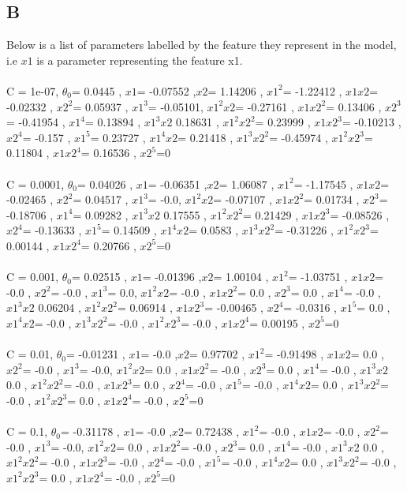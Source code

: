 \documentclass[11pt]{article} %
\begin{document}
\subsection{B}
Below is a list of parameters labelled by the feature they represent in the model, i.e \(x1\) is a parameter representing the feature x1.\\\\
C = 1e-07, \(\theta_0\)= 0.0445 , \(x1\)= -0.07552 ,\(x2\)= 1.14206 , \(x1^2\)= -1.22412 , \(x1 x2\)= -0.02332 , \(x2^2\)= 0.05937 , \(x1^3\)= -0.05101, \(x1^2 x2\)= -0.27161 , \(x1 x2^2\)= 0.13406 , \(x2^3\)= -0.41954 , \(x1^4\)= 0.13894 , \(x1^3 x2\) 0.18631 , \(x1^2 x2^2\)= 0.23999 , \(x1 x2^3\)= -0.10213 , \(x2^4\)= -0.157 , \(x1^5\)= 0.23727 , \(x1^4 x2\)= 0.21418 , \(x1^3 x2^2\)= -0.45974 , \(x1^2 x2^3\)= 0.11804 , \(x1 x2^4\)= 0.16536 , \(x2^5\)=0 \\\\
 C = 0.0001, \(\theta_0\)= 0.04026 , \(x1\)= -0.06351 ,\(x2\)= 1.06087 , \(x1^2\)= -1.17545 , \(x1 x2\)= -0.02465 , \(x2^2\)= 0.04517 , \(x1^3\)= -0.0, \(x1^2 x2\)= -0.07107 , \(x1 x2^2\)= 0.01734 , \(x2^3\)= -0.18706 , \(x1^4\)= 0.09282 , \(x1^3 x2\) 0.17555 , \(x1^2 x2^2\)= 0.21429 , \(x1 x2^3\)= -0.08526 , \(x2^4\)= -0.13633 , \(x1^5\)= 0.14509 , \(x1^4 x2\)= 0.0583 , \(x1^3 x2^2\)= -0.31226 , \(x1^2 x2^3\)= 0.00144 , \(x1 x2^4\)= 0.20766 , \(x2^5\)=0 \\\\
 C = 0.001, \(\theta_0\)= 0.02515 , \(x1\)= -0.01396 ,\(x2\)= 1.00104 , \(x1^2\)= -1.03751 , \(x1 x2\)= -0.0 , \(x2^2\)= -0.0 , \(x1^3\)= 0.0, \(x1^2 x2\)= -0.0 , \(x1 x2^2\)= 0.0 , \(x2^3\)= 0.0 , \(x1^4\)= -0.0 , \(x1^3 x2\) 0.06204 , \(x1^2 x2^2\)= 0.06914 , \(x1 x2^3\)= -0.00465 , \(x2^4\)= -0.0316 , \(x1^5\)= 0.0 , \(x1^4 x2\)= -0.0 , \(x1^3 x2^2\)= -0.0 , \(x1^2 x2^3\)= -0.0 , \(x1 x2^4\)= 0.00195 , \(x2^5\)=0 \\\\
 C = 0.01, \(\theta_0\)= -0.01231 , \(x1\)= -0.0 ,\(x2\)= 0.97702 , \(x1^2\)= -0.91498 , \(x1 x2\)= 0.0 , \(x2^2\)= -0.0 , \(x1^3\)= -0.0, \(x1^2 x2\)= 0.0 , \(x1 x2^2\)= -0.0 , \(x2^3\)= 0.0 , \(x1^4\)= -0.0 , \(x1^3 x2\) 0.0 , \(x1^2 x2^2\)= -0.0 , \(x1 x2^3\)= 0.0 , \(x2^4\)= -0.0 , \(x1^5\)= -0.0 , \(x1^4 x2\)= 0.0 , \(x1^3 x2^2\)= -0.0 , \(x1^2 x2^3\)= 0.0 , \(x1 x2^4\)= -0.0 , \(x2^5\)=0 \\\\
 C = 0.1, \(\theta_0\)= -0.31178 , \(x1\)= -0.0 ,\(x2\)= 0.72438 , \(x1^2\)= -0.0 , \(x1 x2\)= -0.0 , \(x2^2\)= -0.0 , \(x1^3\)= -0.0, \(x1^2 x2\)= 0.0 , \(x1 x2^2\)= -0.0 , \(x2^3\)= 0.0 , \(x1^4\)= -0.0 , \(x1^3 x2\) 0.0 , \(x1^2 x2^2\)= -0.0 , \(x1 x2^3\)= -0.0 , \(x2^4\)= -0.0 , \(x1^5\)= -0.0 , \(x1^4 x2\)= 0.0 , \(x1^3 x2^2\)= -0.0 , \(x1^2 x2^3\)= 0.0 , \(x1 x2^4\)= -0.0 , \(x2^5\)=0 \\\\
\end{document}
